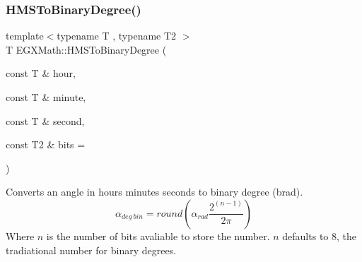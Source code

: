 \subsubsection{\texorpdfstring{H\+M\+S\+To\+Binary\+Degree()}{HMSToBinaryDegree()}}
{\footnotesize\ttfamily template$<$typename T , typename T2 $>$ \\
T E\+G\+X\+Math\+::\+H\+M\+S\+To\+Binary\+Degree (\begin{DoxyParamCaption}\item[{const T \&}]{hour,  }\item[{const T \&}]{minute,  }\item[{const T \&}]{second,  }\item[{const T2 \&}]{bits = {} }\end{DoxyParamCaption})}



Converts an angle in hours minutes seconds to binary degree (brad). \[\alpha_{deg\ bin}=round(\alpha_{rad}\frac{2^{(n-1)}}{2 \pi})\] Where $n$ is the number of bits avaliable to store the number. $n$ defaults to 8, the tradiational number for binary degrees. 

